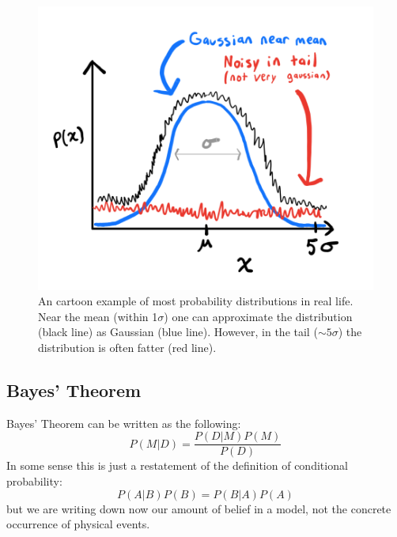 \documentclass[12pt]{article}
\begin{document}
\begin{figure}[ht]
\includegraphics[scale=0.75]{gaussian_noise_plot.png}
\centering
\caption{An cartoon example of most probability distributions in real life. Near the mean (within 1$\sigma$) one can approximate the distribution (black line) as Gaussian (blue line). However, in the tail ($\sim 5\sigma$) the distribution is often fatter (red line).} \label{fig:gaussian_noise_plot}
\end{figure}

\newpage
\subsection{Bayes' Theorem}
Bayes' Theorem can be written as the following:
\begin{equation}
    P(M|D) = \frac{P(D|M)P(M)}{P(D)}
\end{equation}
In some sense this is just a restatement of the definition of conditional probability:
\begin{equation}
    P(A|B)P(B) = P(B|A)P(A)
\end{equation}
but we are writing down now our amount of belief in a model, not the concrete occurrence of physical events.
\end{document}
